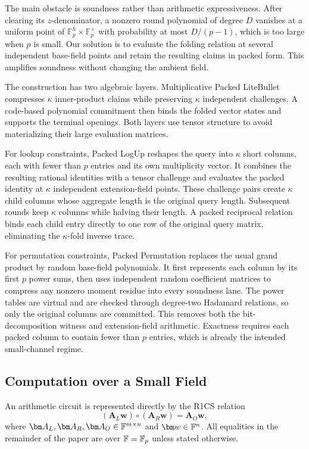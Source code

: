\documentclass[runningheads]{llncs}
\begin{document}
The main obstacle is soundness rather than arithmetic expressiveness.
After clearing its \(z\)-denominator, a nonzero round polynomial of
degree \(D\) vanishes at a uniform point of
\(\mathbb F_p^h\times\mathbb F_p^\times\) with probability at most
\(D/(p-1)\), which is too large when \(p\) is small.  Our solution is
to evaluate the folding relation at several independent base-field
points and retain the resulting claims in packed form.  This amplifies
soundness without changing the ambient field.

The construction has two algebraic layers.  Multiplicative Packed
LiteBullet compresses \(\kappa\) inner-product claims while preserving
\(\kappa\) independent challenges.  A code-based polynomial commitment
then binds the folded vector states and supports the terminal openings.
Both layers use tensor structure to avoid materializing their large
evaluation matrices.

For lookup constraints, Packed LogUp reshapes the query into
\(\kappa\) short columns, each with fewer than \(p\) entries and its own
multiplicity vector.  It combines the resulting rational identities
with a tensor challenge and evaluates the packed identity at
\(\kappa\) independent extension-field points.  These challenge pairs
create \(\kappa\) child columns whose aggregate length is the original
query length.  Subsequent rounds keep \(\kappa\) columns while halving
their length.  A packed reciprocal relation binds each child entry
directly to one row of the original query matrix, eliminating the
\(\kappa\)-fold inverse trace.

For permutation constraints, Packed Permutation replaces the usual
grand product by random base-field polynomials.  It first represents
each column by its first \(p\) power sums, then uses independent random
coefficient matrices to compress any nonzero moment residue into every
soundness lane.  The power tables are virtual and are checked through
degree-two Hadamard relations, so only the original columns are
committed.  This removes both the bit-decomposition witness and
extension-field arithmetic.  Exactness requires each packed column to
contain fewer than \(p\) entries, which is already the intended
small-channel regime.

\subsection{Computation over a Small Field}
\label{sec:small-field}

An arithmetic circuit is represented directly by the R1CS relation
\[
    (\bm A_L\bm w)\circ(\bm A_R\bm w)
       =\bm A_O\bm w,
\]
where
\(\bm A_L,\bm A_R,\bm A_O\in\Field^{m\times n}\) and
\(\bm w\in\Field^n\).  All equalities in the remainder of the paper are
over \({\mathbb{F}}=\mathbb F_p\) unless stated otherwise.
\end{document}

